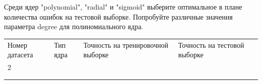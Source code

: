 \documentclass[a4paper,14pt]{article}
\begin{document}
Среди ядер "polynomial", "radial" и "sigmoid" выберите оптимальное в плане количества ошибок на тестовой выборке. Попробуйте различные значения параметра degree для полиномиального ядра.

\begin{table}
\begin{tabular}{lllll}
Номер датасета & Тип ядра & Точность на тренировочной выборке & Точность на тестовой выборке\\
2 &  &  &  &  \\
 &  &  &  &  \\
 &  &  &  & 
\end{tabular}
\end{table}
\end{document}
